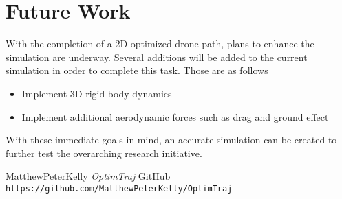 \documentclass[12pt]{article}
\begin{document}
	\section{Future Work}
	With the completion of a 2D optimized drone path, plans to enhance the simulation are underway. Several additions will be added to the current simulation in order to complete this task. Those are as follows 
	\newline
	\begin{itemize}
		\item Implement 3D rigid body dynamics
		\item Implement additional aerodynamic forces such as drag and ground effect
	\end{itemize}
	With these immediate goals in mind, an accurate simulation can be created to further test the overarching research initiative.
	\clearpage
	\begin{thebibliography}{9}
		MatthewPeterKelly
		\textit{OptimTraj}
		GitHub
		\\\texttt{https://github.com/MatthewPeterKelly/OptimTraj}
	\end{thebibliography}
	
\end{document}
